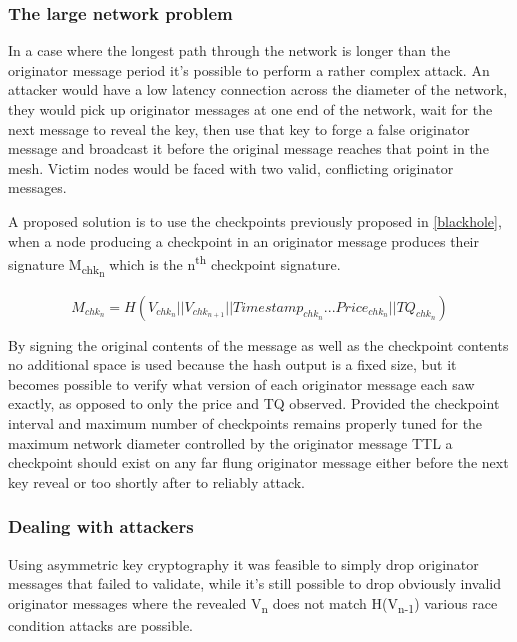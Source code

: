 \documentclass[11pt]{article}
\begin{document}
               \subsubsection{The large network problem}
                        
                        In a case where the longest path through the network is longer than the originator message period it's possible to perform a rather complex attack. An attacker would have a low latency connection across the diameter of the network, they would pick up originator messages at one end of the network, wait for the next message to reveal the key, then use that key to forge a false originator message and broadcast it before the original message reaches that point in the mesh. Victim nodes would be faced with two valid, conflicting originator messages.
                        
                        A proposed solution is to use the checkpoints previously proposed in \ref{blackhole}, when a node producing a checkpoint in an originator message produces their signature M\textsubscript{chk\textsubscript{n}} which is the n\textsuperscript{th} checkpoint signature.
                        
                        \[M_{chk_n} = H(V_{chk_n}||V_{chk_{n+1}}||Timestamp_{chk_n}...Price_{chk_n}||TQ_{chk_n})\]
                        
                        By signing the original contents of the message as well as the checkpoint contents no additional space is used because the hash output is a fixed size, but it becomes possible to verify what version of each originator message each saw exactly, as opposed to only the price and TQ observed. Provided the checkpoint interval and maximum number of checkpoints remains properly tuned for the maximum network diameter controlled by the originator message TTL a checkpoint should exist on any far flung originator message either before the next key reveal or too shortly after to reliably attack.
                                                
               \subsubsection{Dealing with attackers}
               
                      Using asymmetric key cryptography it was feasible to simply drop originator messages that failed to validate, while it's still possible to drop obviously invalid originator messages where the revealed V\textsubscript{n} does not match H(V\textsubscript{n-1}) various race condition attacks are possible. 
                          
\end{document}
